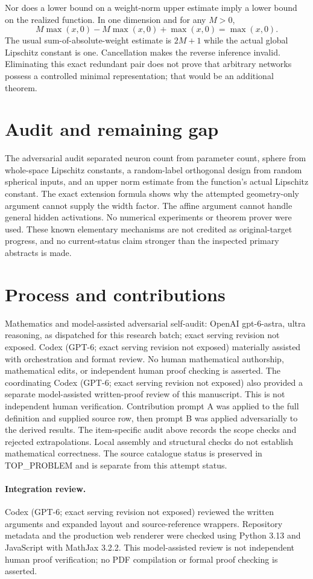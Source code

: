 \documentclass[11pt]{article}
\begin{document}
Nor does a lower bound on a weight-norm upper estimate imply a
lower bound on the realized function. In one dimension and for
any $M>0$,
\[
 M\max(x,0)-M\max(x,0)+\max(x,0)=\max(x,0).
\]
The usual sum-of-absolute-weight estimate is $2M+1$ while the
actual global Lipschitz constant is one. Cancellation makes the
reverse inference invalid. Eliminating this exact redundant pair
does not prove that arbitrary networks possess a controlled
minimal representation; that would be an additional theorem.

\section{Audit and remaining gap}
The adversarial audit separated neuron count from parameter count,
sphere from whole-space Lipschitz constants, a random-label
orthogonal design from random spherical inputs, and an upper
norm estimate from the function's actual Lipschitz constant.
The exact extension formula shows why the attempted geometry-only
argument cannot supply the width factor. The affine argument
cannot handle general hidden activations. No numerical experiments
or theorem prover were used. These known elementary mechanisms
are not credited as original-target progress, and no current-status
claim stronger than the inspected primary abstracts is made.

\section{Process and contributions}
Mathematics and model-assisted adversarial self-audit: OpenAI gpt-6-astra, ultra reasoning, as dispatched for this research batch; exact serving revision not exposed. Codex (GPT-6; exact serving revision not exposed) materially assisted with orchestration and format review. No human mathematical authorship, mathematical edits, or independent human proof checking is asserted.
The coordinating Codex (GPT-6; exact serving revision not exposed) also provided a separate model-assisted written-proof review of this manuscript. This is not independent human verification.
Contribution prompt A was applied to the full definition and supplied source row, then prompt B was applied adversarially to the derived results. The item-specific audit above records the scope checks and rejected extrapolations. Local assembly and structural checks do not establish mathematical correctness. The source catalogue status is preserved in TOP\_PROBLEM and is separate from this attempt status.
\paragraph{Integration review.} Codex (GPT-6; exact serving revision not exposed) reviewed the written arguments and expanded layout and source-reference wrappers. Repository metadata and the production web renderer were checked using Python 3.13 and JavaScript with MathJax 3.2.2. This model-assisted review is not independent human proof verification; no PDF compilation or formal proof checking is asserted.
\end{document}

